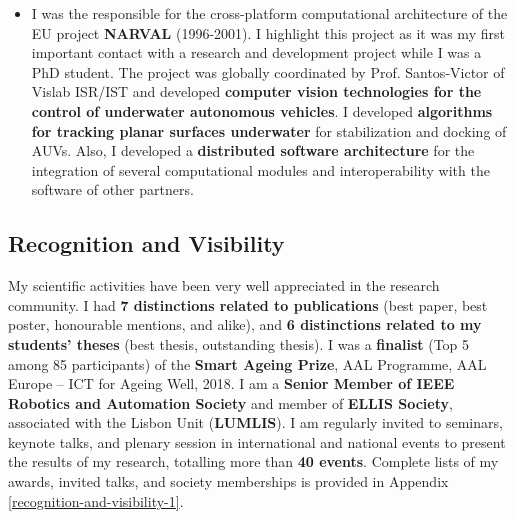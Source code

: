 \begin{itemize}
  as part of the RBCog lab, which has been used to support the
  graduation of many PhD students. It created a community of users and
  spin-off projects that paved the way for the growth of research in the
  \textbf{humanoid robotics} field.
\item
  I was the responsible for the cross-platform computational
  architecture of the EU project \textbf{NARVAL} (1996-2001). I
  highlight this project as it was my first important contact with a
  research and development project while I was a PhD student. The
  project was globally coordinated by Prof. Santos-Victor of Vislab
  ISR/IST and developed \textbf{computer vision technologies for the
  control of underwater autonomous vehicles}. I developed
  \textbf{algorithms for tracking planar surfaces underwater} for
  stabilization and docking of AUVs. Also, I developed a
  \textbf{distributed software architecture} for the integration of
  several computational modules and interoperability with the software
  of other partners.
\end{itemize}

\subsection{Recognition and
Visibility}\label{recognition-and-visibility}

My scientific activities have been very well appreciated in the research
community. I had \textbf{7 distinctions related to publications} (best
paper, best poster, honourable mentions, and alike), and \textbf{6
distinctions related to my students' theses} (best thesis, outstanding
thesis). I was a \textbf{finalist} (Top 5 among 85 participants) of the
\textbf{Smart Ageing Prize}, AAL Programme, AAL Europe -- ICT for Ageing
Well, 2018. I am a \textbf{Senior Member of IEEE Robotics and Automation
Society} and member of \textbf{ELLIS Society}, associated with the
Lisbon Unit (\textbf{LUMLIS}). I am regularly invited to seminars,
keynote talks, and plenary session in international and national events
to present the results of my research, totalling more than \textbf{40
events}. Complete lists of my awards, invited talks, and society
memberships is provided in Appendix \ref{recognition-and-visibility-1}.
